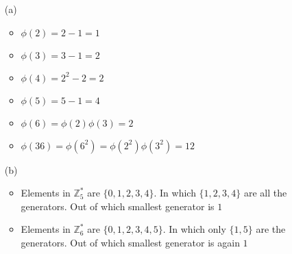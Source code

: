 \begin{itemize}
	\item [(a)]
    \begin{itemize}
        \item $\phi(2) =2-1= 1$
        \item $\phi(3) = 3-1 =2$
        \item $\phi(4) = 2^2 - 2 = 2$
        \item $\phi(5) = 5 - 1 = 4$
        \item $\phi(6) = \phi(2)\phi(3) = 2$
        \item $\phi(36) = \phi(6^2) = \phi(2^2)\phi(3^2) = 12$
    \end{itemize}
    \item [(b)]
    \begin{itemize}
        \item Elements in $\mathbb{Z}^*_5$ are $\{0,1,2,3,4\}$. In which $\{1,2,3,4\}$ are all the generators. Out of which smallest generator is $1$
        \item Elements in $\mathbb{Z}^*_6$ are $\{0,1,2,3,4,5\}$. In which only $\{1,5\}$ are the generators. Out of which smallest generator is again $1$
    \end{itemize}
\end{itemize}